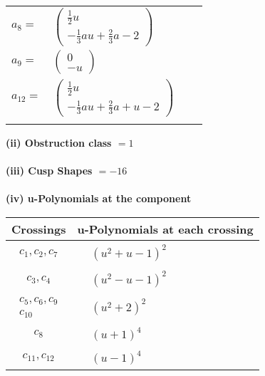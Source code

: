 \documentclass[1p]{elsarticle_modified}
\theoremstyle{definition}
\begin{document}
\begin{tabular}{m{7pt} m{180pt} m{7pt} m{180pt} }
\flushright $a_{8}=$&$\begin{pmatrix}\frac{1}{2} u\\-\frac{1}{3} a u+\frac{2}{3} a-2\end{pmatrix}$ \\
\flushright $a_{9}=$&$\begin{pmatrix}0\\- u\end{pmatrix}$ \\
\flushright $a_{12}=$&$\begin{pmatrix}\frac{1}{2} u\\-\frac{1}{3} a u+\frac{2}{3} a+u-2\end{pmatrix}$\\&\end{tabular}
\flushleft \textbf{(ii) Obstruction class $= 1$}\\~\\
\flushleft \textbf{(iii) Cusp Shapes $= -16$}\\~\\
\newpage\renewcommand{\arraystretch}{1}
\flushleft \textbf{(iv) u-Polynomials at the component}\newline \\
\begin{tabular}{m{50pt}|m{274pt}}
Crossings & \hspace{64pt}u-Polynomials at each crossing \\
\hline $$\begin{aligned}c_{1},c_{2},c_{7}\end{aligned}$$&$\begin{aligned}
&(u^2+u-1)^2
\end{aligned}$\\
\hline $$\begin{aligned}c_{3},c_{4}\end{aligned}$$&$\begin{aligned}
&(u^2- u-1)^2
\end{aligned}$\\
\hline $$\begin{aligned}c_{5},c_{6},c_{9}\\c_{10}\end{aligned}$$&$\begin{aligned}
&(u^2+2)^2
\end{aligned}$\\
\hline $$\begin{aligned}c_{8}\end{aligned}$$&$\begin{aligned}
&(u+1)^4
\end{aligned}$\\
\hline $$\begin{aligned}c_{11},c_{12}\end{aligned}$$&$\begin{aligned}
&(u-1)^4
\end{aligned}$\\
\hline
\end{tabular}\\~\\
\end{document}
